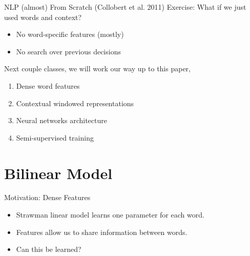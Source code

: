 \documentclass{beamer}
\begin{document}

\begin{frame}{NLP (almost) From Scratch (Collobert et al. 2011)}
  Exercise: What if we just used words and context?

  \begin{itemize}
  \item No word-specific features (mostly)
    \air

  \item No search over previous decisions

    \air
  \end{itemize}



  Next couple classes, we will work our way up to this paper,

  \begin{enumerate}
  \item Dense word features
  \item Contextual windowed representations
  \item Neural networks architecture
  \item Semi-supervised training
  \end{enumerate}
\end{frame}


\section{Bilinear Model}

\begin{frame}{Motivation: Dense Features}
  \begin{itemize}
  \item Strawman linear model learns one parameter for each word.
    \air
  \item Features allow us to share information between words.
    \air
  \item Can this be learned?
  \end{itemize}
\end{frame}
\end{document}
